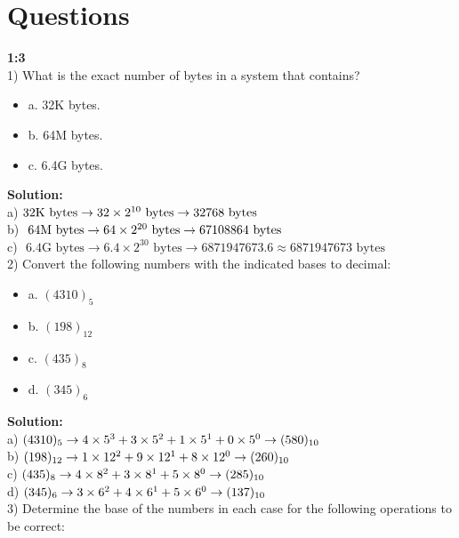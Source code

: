 \documentclass[a4paper,12pt]{extarticle}
\begin{document}
\section*{\LARGE Questions }\textbf{\LARGE {1:3}}\\[0.5cm]
1) What is the exact number of bytes in a system that contains?
\begin{itemize}
\item a. 32K bytes.
\item b. 64M bytes.
\item c. 6.4G bytes.
\end{itemize}
{\color{blue}\textbf{Solution:}}\\[0.3cm]
\indent \color{red} a)$ \color{black} \text{ 32K bytes} \rightarrow 32 \times 2^{10} \text{ bytes} \rightarrow 32768 \text{ bytes}$\\[0.4cm]
\indent \color{red} b) \color{black}$ \color{black} \text{ 64M bytes} \rightarrow 64 \times 2^{20} \text{ bytes} \rightarrow 67108864 \text{ bytes}$\\[0.4cm]
\indent \color{red} c) \color{black}$\text{ 6.4G bytes} \rightarrow 6.4 \times 2^{30}  \text{ bytes} \rightarrow 6871947673.6 \approx 6871947673 \text{ bytes} $\\[0.5cm]
2) Convert the following numbers with the indicated bases to decimal:
\begin{itemize}
\item a. $(4310)_5$
\item b. $(198)_{12}$
\item c. $(435)_8$
\item d. $(345)_6$
\end{itemize}
{\color{blue}\textbf{Solution:}}\\[0.3cm]
\indent \color{red} a) $\color{black} (4310)_5 \rightarrow 4 \times 5^3 + 3 \times 5^2 + 1 \times 5^1 + 0 \times 5^0 \rightarrow (580)_{10} $\\[0.4cm]
\indent \color{red} b) $\color{black} (198)_{12} \rightarrow 1 \times 12^2 + 9 \times 12^1 + 8 \times 12^0 \rightarrow (260)_{10} $\\[0.4cm]
\indent \color{red} c) $\color{black} (435)_8 \rightarrow 4 \times 8^2 + 3 \times 8^1 + 5 \times 8^0 \rightarrow (285)_{10} $\\[0.5cm]
\indent \color{red} d) \color{black} $\color{black} (345)_6 \rightarrow 3 \times 6^2 + 4 \times 6^1 + 5 \times 6^0 \rightarrow (137)_{10} $\\[0.5cm]
3) Determine the base of the numbers in each case for the following operations to be correct:
\end{document}
